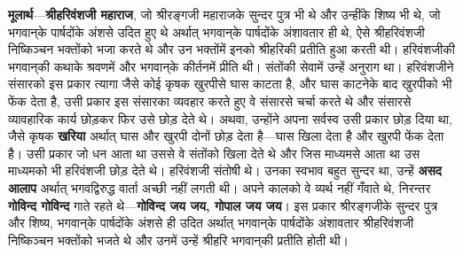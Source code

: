 \begin{sloppypar}\justifying{}
\textbf{मूलार्थ}—\textbf{श्रीहरिवंशजी महाराज}, जो श्रीरङ्गजी महाराजके सुन्दर पुत्र भी थे और उन्हींके शिष्य भी थे, जो भगवान्‌के पार्षदोंके अंशसे उदित हुए थे अर्थात् भगवान्‌के पार्षदोंके अंशावतार ही थे, ऐसे श्रीहरिवंशजी निष्किञ्चन भक्तोंको भजा करते थे और उन भक्तोंमें इनको श्रीहरिकी प्रतीति हुआ करती थी। हरिवंशजीकी भगवान्‌की कथाके श्रवणमें और भगवान्‌के कीर्तनमें प्रीति थी। संतोंकी सेवामें उन्हें अनुराग था। हरिवंशजीने संसारको इस प्रकार त्यागा जैसे कोई कृषक खुरपीसे घास काटता है, और घास काटनेके बाद खुरपीको भी फेंक देता है, उसी प्रकार इस संसारका व्यवहार करते हुए वे संसारसे चर्चा करते थे और संसारसे व्यावहारिक कार्य छोड़कर फिर उसे छोड़ देते थे। अथवा, उन्होंने अपना सर्वस्व उसी प्रकार छोड़ दिया था, जैसे कृषक \textbf{खरिया} अर्थात् घास और खुरपी दोनों छोड़ देता है—घास खिला देता है और खुरपी फेंक देता है। उसी प्रकार जो धन आता था उससे वे संतोंको खिला देते थे और जिस माध्यमसे आता था उस माध्यमको भी हरिवंशजी छोड़ देते थे। हरिवंशजी संतोषी थे। उनका स्वभाव बहुत सुन्दर था, उन्हें \textbf{असद आलाप} अर्थात् भगवद्विरुद्ध वार्ता अच्छी नहीं लगती थी। अपने कालको वे व्यर्थ नहीं गँवाते थे, निरन्तर \textbf{गोविन्द गोविन्द} गाते रहते थे—\textbf{गोविन्द जय जय, गोपाल जय जय}। इस प्रकार श्रीरङ्गजीके सुन्दर पुत्र और शिष्य, भगवान्‌के पार्षदोंके अंशसे ही उदित अर्थात् भगवान्‌के पार्षदोंके अंशावतार श्रीहरिवंशजी निष्किञ्चन भक्तोंको भजते थे और उनमें उन्हें श्रीहरि भगवान्‌की प्रतीति होती थी।
\end{sloppypar}


